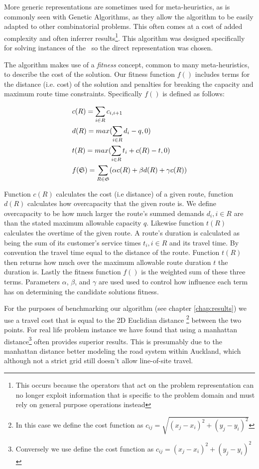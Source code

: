 
More generic representations are sometimes used for meta-heuristics, as is commonly seen with Genetic Algorithms, as they allow the algorithm to be easily adapted to other combinatorial problems. This often comes at a cost of added complexity and often inferrer results\footnote{This occurs because the operators that act on the problem representation can no longer exploit information that is specific to the problem domain and must rely on general purpose operations instead}. This algorithm was designed specifically for solving instances of the \VRP\ so the direct representation was chosen. 

The algorithm makes use of a \emph{fitness} concept, common to many meta-heuristics, to describe the cost of the solution. Our fitness function $f()$ includes terms for the distance (i.e. cost) of the solution and penalties for breaking the capacity and maximum route time constraints. Specifically $f()$ is defined as follows:

\begin{align}
   & c(R) = \sum_{i \in R} c_{i, i+1} \\
   & d(R) = max( \sum_{i \in R} d_i - q, 0 )  \\
   & t(R) = max( \sum_{i \in R} t_i + c(R) - t, 0 )  \\
   & f(\mathfrak{S}) = \sum_{R \in \mathfrak{S}} (\alpha c(R) + \beta d(R) + \gamma c(R))
\end{align}

Function $c(R)$ calculates the cost (i.e distance) of a given route, function $d(R)$ calculates how overcapacity that the given route is. We define overcapacity to be how much larger the route's summed demands $d_i, i \in R$ are than the stated maximum allowable capacity $q$. Likewise function $t(R)$ calculates the overtime of the given route. A route's duration is calculated as being the sum of its customer's service times $t_i, i \in R$ and its travel time. By convention the travel time equal to the distance of the route. Function $t(R)$ then returns how much over the maximum allowable route duration $t$ the duration is. Lastly the fitness function $f()$ is the weighted sum of these three terms. Parameters $\alpha$, $\beta$, and $\gamma$ are used  used to control how influence each term has on determining the candidate solutions fitness.

For the purposes of benchmarking our algorithm (see chapter \ref{chap:results}) we use a travel cost that is equal to the 2D Euclidian distance \footnote{In this case we define the cost function as $c_{ij} = \sqrt{(x_j-x_i)^2 + (y_j-y_i)^2}$} between the two points. For real life problem instance we have found that using a manhattan distance\footnote{Conversely we use define the cost function as $c_{ij} = (x_j-x_i)^2 + (y_j-y_i)^2$} often provides superior results. This is presumably due to the manhattan distance better modeling the road system within Auckland, which although not a strict grid still doesn't allow line-of-site travel.


